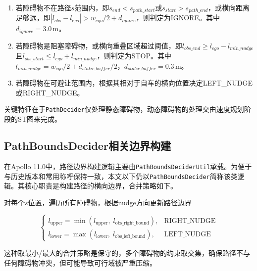 \begin{enumerate}
\item 若障碍物不在路径$s$范围内，即$s_{end} < s_{path\_start}$或$s_{start} > s_{path\_end}$，或横向距离足够远，即$|l_{obs} - l_{ego}| > w_{ego}/2 + d_{ignore}$，则判定为IGNORE。其中$d_{ignore} = 3.0$\,m。

\item 若障碍物是阻塞障碍物，或横向重叠区域超过阈值，即$l_{obs\_end} \geq l_{ego} - l_{min\_nudge}$且$l_{obs\_start} \leq l_{ego} + l_{min\_nudge}$，则判定为STOP。其中$l_{min\_nudge} = w_{ego}/2 + d_{static\_buffer}/2$，$d_{static\_buffer} = 0.3$\,m。

\item 若障碍物在可避让范围内，根据其相对于自车的横向位置决定LEFT\_NUDGE或RIGHT\_NUDGE。
\end{enumerate}

关键特征在于\texttt{PathDecider}仅处理静态障碍物，动态障碍物的处理交由速度规划阶段的ST图来完成。

\subsection{PathBoundsDecider相关边界构建}
\label{sec:pathbounds_decider}

在Apollo 11.0中，路径边界构建逻辑主要由\texttt{PathBoundsDeciderUtil}承载。为便于与历史版本和常用称呼保持一致，本文以下仍以\texttt{PathBoundsDecider}简称该类逻辑。其核心职责是构建路径的横向边界，合并策略如下。

对每个$s$位置，遍历所有障碍物，根据nudge方向更新路径边界

\begin{equation}                                        
  \begin{cases}
  l_{\mathrm{upper}} = \min(l_{\mathrm{upper}},\; l_{\mathrm{obs\_right\_bound}}), & \text{RIGHT\_NUDGE} \\                                                                                          
  l_{\mathrm{lower}} = \max(l_{\mathrm{lower}},\; l_{\mathrm{obs\_left\_bound}}), & \text{LEFT\_NUDGE}                                                                                               
  \end{cases}                                                                                                                                                                                        
\end{equation} 

这种取最小/最大的合并策略是保守的，多个障碍物的约束取交集，确保路径不与任何障碍物冲突，但可能导致可行域被严重压缩。

